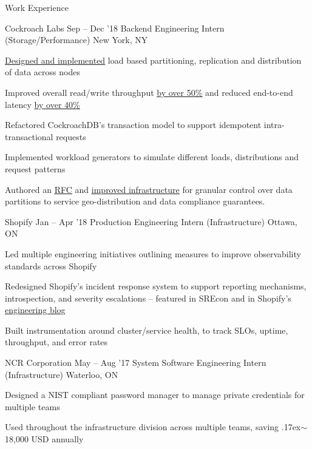 \documentclass{resume} %
\begin{document}
\begin{rSection}{Work Experience}
  \begin{rSubsection}{Cockroach Labs}
    {Sep -- Dec '18}
         {Backend Engineering Intern (Storage/Performance)}
         {New York, NY}
       \item \href{https://github.com/cockroachdb/cockroach/pull/31413}
      {\underline{Designed and implemented}} load based partitioning, replication and distribution of data across nodes
    \item Improved overall read/write throughput
         \href{https://github.com/cockroachdb/cockroach/issues/31819}{\underline{by over 50\%}}
         and reduced end-to-end latency \href{https://github.com/cockroachdb/cockroach/issues/31819}{\underline{by over 40\%}}
       \item Refactored CockroachDB's transaction model to support idempotent intra-transactional
         requests
       \item Implemented workload generators to simulate different loads, distributions and request patterns
       \item Authored an \href{https://github.com/cockroachdb/cockroach/pull/30426}{\underline{RFC}}
         and \href{https://github.com/cockroachdb/cockroach/pull/30611}{\underline{improved infrastructure}} 
         for granular control over data partitions to service geo-distribution and data compliance guarantees.
  \end{rSubsection}

  \begin{rSubsection}{Shopify}
		     {Jan -- Apr '18}
		     {Production Engineering Intern (Infrastructure)}
		     {Ottawa, ON}
    \item Led multiple engineering initiatives outlining measures to improve
      observability standards across Shopify
    \item Redesigned Shopify's incident response system
      to support reporting mechanisms, introspection, and severity
      escalations -- featured in SREcon and in Shopify's
      \href{https://engineering.shopify.com/blogs/engineering/implementing-chatops-into-our-incident-management-procedure}
      {\underline{engineering blog}}
    \item Built instrumentation around cluster/service health, to track 
      SLOs, uptime, throughput, and error rates
  \end{rSubsection}

  \begin{rSubsection}{NCR Corporation}
		     {May -- Aug '17}
		     {System Software Engineering Intern (Infrastructure)}
		     {Waterloo, ON}
    \item Designed a NIST compliant password manager to manage private
      credentials for multiple teams
    \item Used throughout the infrastructure division across multiple
      teams, saving {\raise.17ex\hbox{$\scriptstyle\mathtt{\sim}$}}18,000 USD
      annually
  \end{rSubsection}
\end{rSection} 
\end{document}
